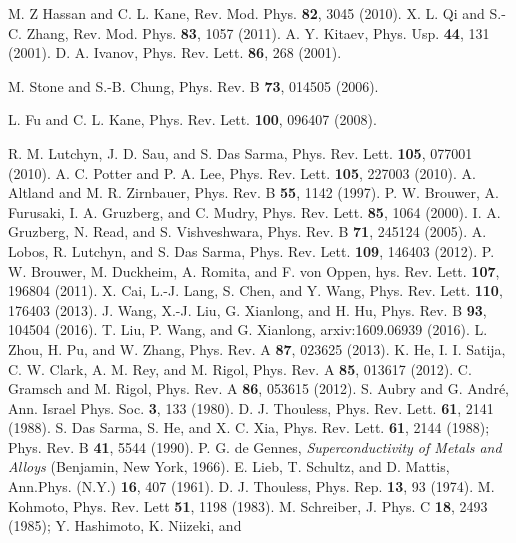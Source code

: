\documentclass[prb,showpacs,twocolumn,aps,superscriptaddress,a4paper]{revtex4-1}
\begin{document}

\begin{thebibliography}{10}
 M. Z Hassan and C. L. Kane, Rev. Mod. Phys. {\bf 82}, 3045 (2010).
 X. L. Qi and S.-C. Zhang, Rev. Mod. Phys. {\bf 83}, 1057 (2011).
 A. Y. Kitaev, Phys. Usp. {\bf 44}, 131 (2001).
 D. A. Ivanov, Phys. Rev. Lett. {\bf 86}, 268 (2001).

 M. Stone and S.-B. Chung, Phys. Rev. B {\bf 73}, 014505 (2006).

 L. Fu and C. L. Kane, Phys. Rev. Lett. {\bf 100}, 096407 (2008).

 R. M. Lutchyn, J. D. Sau, and S. Das Sarma, Phys. Rev. Lett.
{\bf 105}, 077001 (2010).
 A. C. Potter and P. A. Lee, Phys. Rev. Lett. {\bf 105}, 227003
(2010).
 A. Altland and M. R. Zirnbauer,
Phys. Rev. B {\bf 55}, 1142 (1997).
 P. W. Brouwer, A. Furusaki, I. A. Gruzberg, and C. Mudry,
Phys. Rev. Lett. {\bf 85}, 1064 (2000).
 I. A. Gruzberg, N. Read, and S. Vishveshwara, Phys. Rev. B
{\bf 71}, 245124 (2005).
 A. Lobos, R. Lutchyn, and S. Das Sarma, Phys. Rev. Lett. {\bf 109}, 146403 (2012).
 P. W. Brouwer, M. Duckheim, A. Romita, and F. von Oppen,
hys. Rev. Lett. {\bf 107}, 196804 (2011).
 X. Cai, L.-J. Lang, S. Chen, and Y. Wang,
Phys. Rev. Lett. {\bf 110}, 176403 (2013).
 J. Wang, X.-J. Liu, G. Xianlong, and H. Hu,
Phys. Rev. B {\bf 93}, 104504 (2016).
 T. Liu, P. Wang, and G. Xianlong, arxiv:1609.06939 (2016).
 L. Zhou, H. Pu, and W. Zhang, Phys. Rev. A {\bf 87}, 023625 (2013).
 K. He, I. I. Satija, C. W. Clark, A. M. Rey, and M. Rigol, Phys. Rev. A {\bf 85}, 013617 (2012).
 C. Gramsch and M. Rigol, Phys. Rev. A {\bf 86}, 053615 (2012).
S. Aubry and G. Andr\'{e}, Ann. Israel Phys. Soc. {\bf 3}, 133 (1980).
D. J. Thouless,
Phys. Rev. Lett. {\bf 61}, 2141 (1988).
S. Das Sarma, S. He, and X. C. Xia,
Phys. Rev. Lett. {\bf 61}, 2144 (1988); Phys. Rev. B {\bf 41}, 5544 (1990).
 P. G. de Gennes, {\it Superconductivity of Metals and
Alloys} (Benjamin, New York, 1966).
  E. Lieb, T. Schultz, and D. Mattis, Ann.Phys.
(N.Y.) \textbf{16}, 407 (1961).
 D. J. Thouless, Phys. Rep. {\bf 13}, 93 (1974).
 M. Kohmoto,
Phys. Rev. Lett {\bf 51}, 1198 (1983).
  M. Schreiber, J. Phys. C {\bf 18}, 2493 (1985); Y. Hashimoto, K. Niizeki, and

\end{thebibliography}
\end{document}
